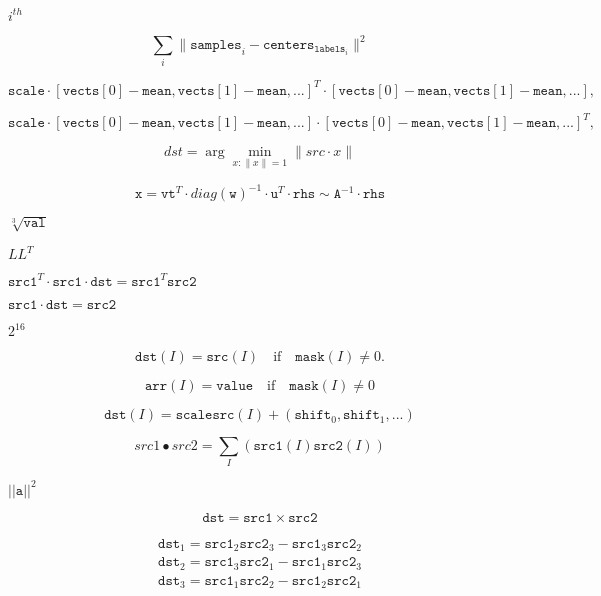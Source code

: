 \documentclass{article}
\begin{document}
$i^{th}$
\pagebreak

\[\sum _i  \| \texttt{samples} _i -  \texttt{centers} _{ \texttt{labels} _i} \| ^2\]
\pagebreak

\[\texttt{scale}   \cdot  [  \texttt{vects}  [0]-  \texttt{mean}  , \texttt{vects}  [1]-  \texttt{mean}  ,...]^T  \cdot  [ \texttt{vects}  [0]- \texttt{mean}  , \texttt{vects}  [1]- \texttt{mean}  ,...],\]
\pagebreak

\[\texttt{scale}   \cdot  [  \texttt{vects}  [0]-  \texttt{mean}  , \texttt{vects}  [1]-  \texttt{mean}  ,...]  \cdot  [ \texttt{vects}  [0]- \texttt{mean}  , \texttt{vects}  [1]- \texttt{mean}  ,...]^T,\]
\pagebreak

\[dst =  \arg \min _{x:  \| x \| =1}  \| src  \cdot x  \|\]
\pagebreak

\[\texttt{x} =  \texttt{vt} ^T  \cdot diag( \texttt{w} )^{-1}  \cdot \texttt{u} ^T  \cdot \texttt{rhs} \sim \texttt{A} ^{-1}  \cdot \texttt{rhs}\]
\pagebreak

$\sqrt[3]{\texttt{val}}$
\pagebreak

$LL^T$
\pagebreak

$\texttt{src1}^T\cdot\texttt{src1}\cdot\texttt{dst}=\texttt{src1}^T\texttt{src2}$
\pagebreak

$\texttt{src1}\cdot\texttt{dst}=\texttt{src2}$
\pagebreak

$2^{16}$
\pagebreak

\[\texttt{dst} (I)= \texttt{src} (I)  \quad \text{if} \quad \texttt{mask} (I)  \ne 0.\]
\pagebreak

\[\texttt{arr} (I)= \texttt{value} \quad \text{if} \quad \texttt{mask} (I)  \ne 0\]
\pagebreak

\[\texttt{dst} (I) =  \texttt{scale} \texttt{src} (I) + ( \texttt{shift} _0, \texttt{shift} _1,...)\]
\pagebreak

\[src1  \bullet src2 =  \sum _I ( \texttt{src1} (I)  \texttt{src2} (I))\]
\pagebreak

$||\texttt{a}||^2$
\pagebreak

\[\texttt{dst} =  \texttt{src1} \times \texttt{src2}\]
\pagebreak

\[\begin{array}{l} \texttt{dst} _1 =  \texttt{src1} _2  \texttt{src2} _3 -  \texttt{src1} _3  \texttt{src2} _2 \\ \texttt{dst} _2 =  \texttt{src1} _3  \texttt{src2} _1 -  \texttt{src1} _1  \texttt{src2} _3 \\ \texttt{dst} _3 =  \texttt{src1} _1  \texttt{src2} _2 -  \texttt{src1} _2  \texttt{src2} _1 \end{array}\]
\pagebreak
\end{document}
